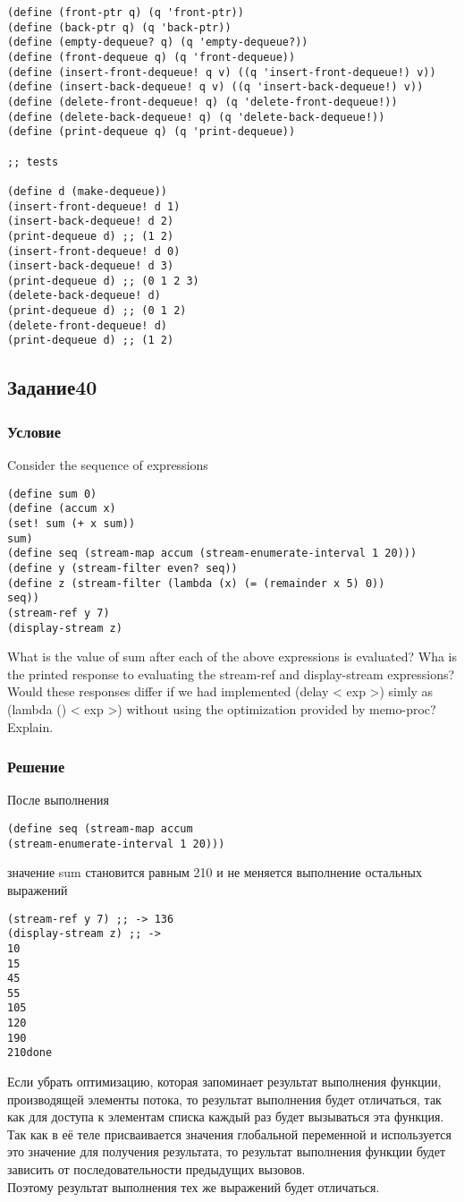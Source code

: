 \documentclass[10pt,a4paper]{article}
\begin{document}
\begin{lstlisting}
(define (front-ptr q) (q 'front-ptr))
(define (back-ptr q) (q 'back-ptr))
(define (empty-dequeue? q) (q 'empty-dequeue?))
(define (front-dequeue q) (q 'front-dequeue))
(define (insert-front-dequeue! q v) ((q 'insert-front-dequeue!) v))
(define (insert-back-dequeue! q v) ((q 'insert-back-dequeue!) v))
(define (delete-front-dequeue! q) (q 'delete-front-dequeue!))
(define (delete-back-dequeue! q) (q 'delete-back-dequeue!))
(define (print-dequeue q) (q 'print-dequeue))

;; tests

(define d (make-dequeue))
(insert-front-dequeue! d 1)
(insert-back-dequeue! d 2)
(print-dequeue d) ;; (1 2)
(insert-front-dequeue! d 0)
(insert-back-dequeue! d 3)
(print-dequeue d) ;; (0 1 2 3)
(delete-back-dequeue! d)
(print-dequeue d) ;; (0 1 2)
(delete-front-dequeue! d)
(print-dequeue d) ;; (1 2)

\end{lstlisting}


\subsection*{Задание40}
\subsubsection*{Условие}
Consider the sequence of expressions
\begin{lstlisting}
(define sum 0)
(define (accum x)
(set! sum (+ x sum))
sum)
(define seq (stream-map accum (stream-enumerate-interval 1 20)))
(define y (stream-filter even? seq))
(define z (stream-filter (lambda (x) (= (remainder x 5) 0))
seq))
(stream-ref y 7)
(display-stream z)
\end{lstlisting}
What is the value of sum after each of the above expressions is evaluated? Wha is the printed response to evaluating the stream-ref and display-stream expressions? Would these responses differ if we had implemented (delay < exp >) simly as (lambda () < exp >) without using the optimization provided by memo-proc? Explain. 
\subsubsection*{Решение}
После выполнения 
\begin{lstlisting}
(define seq (stream-map accum
(stream-enumerate-interval 1 20))) 
\end{lstlisting}
значение sum становится равным 210
и не меняется выполнение остальных выражений 
\begin{lstlisting}
(stream-ref y 7) ;; -> 136
(display-stream z) ;; -> 
10
15
45
55
105
120
190
210done 
\end{lstlisting}
Если убрать оптимизацию, которая запоминает результат выполнения
функции, производящей элементы потока, то результат выполнения будет
отличаться, так как для доступа к элементам списка каждый раз будет
вызываться эта функция. Так как в её теле присваивается
значения глобальной переменной и используется это значение для получения
результата, то результат выполнения функции будет зависить от 
последовательности предыдущих вызовов.  \\
Поэтому результат выполнения тех же выражений будет отличаться.
\end{document}
